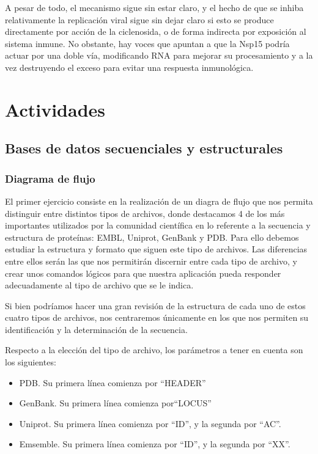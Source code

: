 \documentclass[12pt]{article}
\begin{document}
A pesar de todo, el mecanismo sigue sin estar claro, y el hecho de que se inhiba relativamente la replicación viral sigue sin dejar claro si esto se produce directamente por acción de la ciclenosida, o de forma indirecta por exposición al sistema inmune. No obstante, hay voces que apuntan a que la Nsp15 podría actuar por una doble vía, modificando RNA para mejorar su procesamiento y a la vez destruyendo el exceso para evitar una respuesta inmunológica.


\section{Actividades}

\subsection{Bases de datos secuenciales y estructurales}
\subsubsection{Diagrama de flujo}
El primer ejercicio consiste en la realización de un diagra de flujo que nos permita distinguir entre distintos tipos de archivos, donde destacamos 4 de los más importantes utilizados por la comunidad científica en lo referente a la secuencia y estructura de proteínas: EMBL, Uniprot, GenBank y PDB. Para ello debemos estudiar la estructura y formato que siguen este tipo de archivos. Las diferencias entre ellos serán las que nos permitirán discernir entre cada tipo de archivo, y crear unos comandos lógicos para que nuestra aplicación pueda responder adecuadamente al tipo de archivo que se le indica.
\newline

Si bien podríamos hacer una gran revisión de la estructura de cada uno de estos cuatro tipos de archivos, nos centraremos únicamente en los que nos permiten su identificación y la determinación de la secuencia.
\newline

Respecto a la elección del tipo de archivo, los parámetros a tener en cuenta son los siguientes:
\begin{itemize}
\item PDB. Su primera línea comienza por ``HEADER''
\item GenBank. Su primera línea comienza por``LOCUS''
\item Uniprot. Su primera línea comienza por ``ID'', y la segunda por ``AC''.
\item Emsemble. Su primera línea comienza por ``ID'', y la segunda por ``XX''.
\end{itemize}
\end{document}
